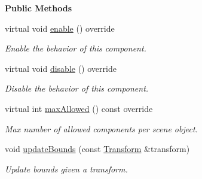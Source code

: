 \begin{Indent}\textbf{ Public Methods}\par
\begin{DoxyCompactItemize}
\item 
\mbox{\label{classrev_1_1_bone_animation_component_a2c11fabab6d5e952f038017c73b20a99}} 
virtual void \mbox{\hyperlink{classrev_1_1_bone_animation_component_a2c11fabab6d5e952f038017c73b20a99}{enable}} () override
\begin{DoxyCompactList}\small\item\em Enable the behavior of this component. \end{DoxyCompactList}\item 
\mbox{\label{classrev_1_1_bone_animation_component_a3d1618efe1cca61182a741129381721f}} 
virtual void \mbox{\hyperlink{classrev_1_1_bone_animation_component_a3d1618efe1cca61182a741129381721f}{disable}} () override
\begin{DoxyCompactList}\small\item\em Disable the behavior of this component. \end{DoxyCompactList}\item 
\mbox{\label{classrev_1_1_bone_animation_component_a089e4d7c8df32961bfc9413d7d9524a2}} 
virtual int \mbox{\hyperlink{classrev_1_1_bone_animation_component_a089e4d7c8df32961bfc9413d7d9524a2}{max\+Allowed}} () const override
\begin{DoxyCompactList}\small\item\em Max number of allowed components per scene object. \end{DoxyCompactList}\item 
\mbox{\label{classrev_1_1_bone_animation_component_a18a0109b7527ccd815c7a8350ef6ad1f}} 
void \mbox{\hyperlink{classrev_1_1_bone_animation_component_a18a0109b7527ccd815c7a8350ef6ad1f}{update\+Bounds}} (const \mbox{\hyperlink{classrev_1_1_transform}{Transform}} \&transform)
\begin{DoxyCompactList}\small\item\em Update bounds given a transform. \end{DoxyCompactList}\end{DoxyCompactItemize}
\end{Indent}
